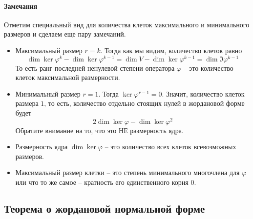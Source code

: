 \paragraph{Замечания}
Отметим специальный вид для количества клеток максимального и минимального размеров и сделаем еще пару замечаний.
\begin{itemize}
\item Максимальный размер $r = k$. Тогда как мы видим, количество клеток равно
\[
\dim \ker \varphi^k - \dim \ker \varphi^{k-1} = 
\dim V - \dim \ker \varphi^{k-1} = \dim \Im\varphi^{k-1}
\]
То есть ранг последней ненулевой степени оператора $\varphi$ -- это количество клеток максимальной размерности.

\item Минимальный размер $r = 1$. Тогда $\ker \varphi^{r - 1} = 0$. Значит, количество клеток размера $1$, то есть, количество отдельно стоящих нулей в жордановой форме будет
\[
2 \dim \ker \varphi - \dim \ker \varphi^{2} 
\]
Обратите внимание на то, что это НЕ размерность ядра.

\item Размерность ядра $\dim \ker \varphi$ -- это количество всех клеток всевозможных размеров.

\item Максимальный размер клетки -- это степень минимального многочлена для $\varphi$ или что то же самое -- кратность его единственного корня $0$.
\end{itemize}

\subsection{Теорема о жордановой нормальной форме}

